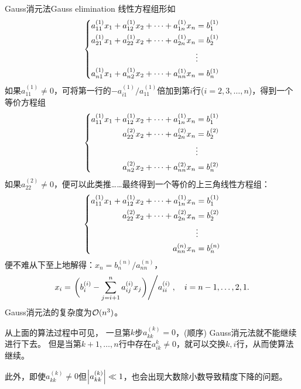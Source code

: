 \begin{theorem}
    {Gauss消元法}{Gauss elimination}
    线性方程组形如
    \begin{equation*}
        \left\{\begin{aligned}
            a_{11}^{(1)}x_1+a_{12}^{(1)}x_2+\cdots+a_{1n}^{(1)}x_n&=b_1^{(1)}\\
            a_{21}^{(1)}x_1+a_{22}^{(1)}x_2+\cdots+a_{2n}^{(1)}x_n&=b_2^{(1)}\\
            &\vdots\\
            a_{n1}^{(1)}x_1+a_{n2}^{(1)}x_2+\cdots+a_{nn}^{(1)}x_n&=b_n^{(1)}
        \end{aligned}\right.
    \end{equation*}
    如果$a_{11}^{(1)}\neq 0$，可将第一行的$-a_{i1}^{(1)}/a_{11}^{(1)}$倍加到第$i$行($i=2,3,\ldots,n$)，得到一个等价方程组
    \begin{equation*}
        \left\{\begin{aligned}
            a_{11}^{(1)}x_1+a_{12}^{(1)}x_2+\cdots+a_{1n}^{(1)}x_n&=b_1^{(1)}\\
            a_{22}^{(2)}x_2+\cdots+a_{2n}^{(2)}x_n&=b_2^{(2)}\\
            &\vdots\\
            a_{n2}^{(2)}x_2+\cdots+a_{nn}^{(2)}x_n&=b_n^{(2)}
        \end{aligned}\right.
    \end{equation*}
    如果$a_{22}^{(2)}\neq 0$，便可以此类推……最终得到一个等价的上三角线性方程组：
    \begin{equation*}
        \left\{\begin{aligned}
            a_{11}^{(1)}x_1+a_{12}^{(1)}x_2+\cdots+a_{1n}^{(1)}x_n&=b_1^{(1)}\\
            a_{22}^{(2)}x_2+\cdots+a_{2n}^{(2)}x_n&=b_2^{(2)}\\
            &\vdots\\
            a_{nn}^{(n)}x_n&=b_n^{(n)}
        \end{aligned}\right.
    \end{equation*}
    便不难从下至上地解得：$x_n=b_n^{(n)}/a_{nn}^{(n)}$，
    \begin{equation}
        x_i=\left.{\biggl(b_{i}^{(i)}-\sum_{j=i+1}^na_{ij}^{(i)}x_j\biggr)}\middle/{a_{ii}^{(i)}}\right.,\quad i=n-1,\ldots,2,1.
    \end{equation}
    Gauss消元法的复杂度为$\mathcal O(n^3)$。
\end{theorem}

\begin{remark}
    从上面的算法过程中可见，
    一旦第$k$步$a_{kk}^{(k)}=0$，(顺序) Gauss消元法就不能继续进行下去。
    但是当第$k+1,\ldots,n$行中存在$a_{ik}^{k}\neq 0$，就可以交换$k,i$行，从而使算法继续。

    此外，即使$a_{kk}^{(k)}\neq 0$但$\left\lvert a_{kk}^{(k)}\right\rvert\ll 1$，也会出现大数除小数导致精度下降的问题。
\end{remark}


